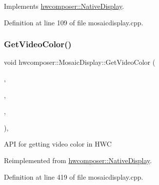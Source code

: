 Implements \mbox{\hyperlink{classhwcomposer_1_1NativeDisplay_aaf80095ae6aed35c64dd633a6a2f101a}{hwcomposer\+::\+Native\+Display}}.



Definition at line 109 of file mosaicdisplay.\+cpp.


\begin{DoxyCode}{0}
\end{DoxyCode}
\mbox{\label{classhwcomposer_1_1MosaicDisplay_ab4b88eb3a5d9a811dada73b0f8d33c4d}} 
\subsubsection{\texorpdfstring{Get\+Video\+Color()}{GetVideoColor()}}
{\footnotesize\ttfamily void hwcomposer\+::\+Mosaic\+Display\+::\+Get\+Video\+Color (\begin{DoxyParamCaption}\item[{H\+W\+C\+Color\+Control}]{,  }\item[{float $\ast$}]{,  }\item[{float $\ast$}]{,  }\item[{float $\ast$}]{ }\end{DoxyParamCaption})\hspace{0.3cm}{\ttfamily [override]}, {\ttfamily [virtual]}}

A\+PI for getting video color in H\+WC 

Reimplemented from \mbox{\hyperlink{classhwcomposer_1_1NativeDisplay_a2db52a8a234064113a0e250a059663ac}{hwcomposer\+::\+Native\+Display}}.



Definition at line 419 of file mosaicdisplay.\+cpp.


\begin{DoxyCode}{0}
\end{DoxyCode}
\mbox{\label{classhwcomposer_1_1MosaicDisplay_a8f006e53e5d0e8c6caf8ac50f25ab407}} 

